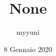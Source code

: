 \documentclass[12pt, a4paper]{article}
\date{8 Gennaio 2020}
\title{None}
\author{myyuni}
\begin{document}
\maketitle

\section{}
\end{document}
